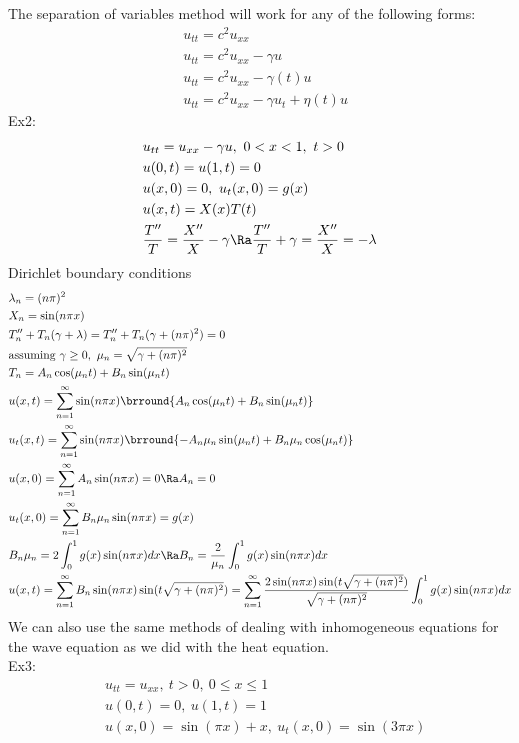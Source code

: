 The separation of variables method will work for any of the following forms:
\begin{align*}
    &u_{tt}=c^2u_{xx}\\
    &u_{tt}=c^2u_{xx}-\gamma u\\
    &u_{tt}=c^2u_{xx}-\gamma(t)u\\
    &u_{tt}=c^2u_{xx}-\gamma u_t+\eta(t) u
\end{align*}
Ex2:
\begin{align*}
    &u_{tt}=u_{xx}-\gamma u,\ 0<x<1,\ t>0\\
    &u(0,t)=u(1,t)=0\\
    &u(x,0)=0,\ u_t(x,0)=g(x)\\
    &u(x,t)=X(x)T(t)\\
    &\frac{T''}{T}=\frac{X''}{X}-\gamma\Ra \frac{T''}{T}+\gamma=\frac{X''}{X}=-\lambda
\end{align*}
Dirichlet boundary conditions
\begin{align*}
    &\lambda_n=(n\pi)^2\\
    &X_n=\sin(n\pi x)\\
    &T_n''+T_n(\gamma+\lambda)=T_n''+T_n(\gamma+(n\pi)^2)=0\\
    &\text{assuming }\gamma\geq0,\ \mu_n=\sqrt{\gamma+(n\pi)^2}\\
    &T_n=A_n\cos(\mu_nt)+B_n\sin(\mu_nt)\\
    &u(x,t)=\sum_{n=1}^\infty\sin(n\pi x)\brround{A_n\cos(\mu_nt)+B_n\sin(\mu_nt)}\\
    &u_t(x,t)=\sum_{n=1}^\infty\sin(n\pi x)\brround{-A_n\mu_n\sin(\mu_nt)+B_n\mu_n\cos(\mu_nt)}\\
    &u(x,0)=\sum_{n=1}^\infty A_n\sin(n\pi x)=0\Ra A_n=0\\
    &u_t(x,0)=\sum_{n=1}^\infty B_n\mu_n\sin(n\pi x)=g(x)\\
    &B_n\mu_n=2\int_0^1g(x)\sin(n\pi x)dx\Ra B_n=\frac{2}{\mu_n}\int_0^1g(x)\sin(n\pi x)dx\\
    &u(x,t)=\sum_{n=1}^\infty B_n\sin(n\pi x)\sin(t\sqrt{\gamma+(n\pi)^2})=\sum_{n=1}^\infty\frac{2\sin(n\pi x)\sin(t\sqrt{\gamma+(n\pi)^2})}{\sqrt{\gamma+(n\pi)^2}}\int_0^1g(x)\sin(n\pi x)dx
\end{align*}
We can also use the same methods of dealing with inhomogeneous equations for the wave equation as we did with the heat equation.\\
Ex3:
\begin{align*}
    &u_{tt}=u_{xx},\ t>0,\ 0\leq x\leq 1\\
    &u(0,t)=0,\ u(1,t)=1\\
    &u(x,0)=\sin(\pi x)+x,\ u_t(x,0)=\sin(3\pi x)
\end{align*}
